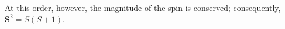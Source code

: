 At this order, however, the magnitude of the spin is conserved; consequently, $\mathbf S^2=S(S+1)$.
